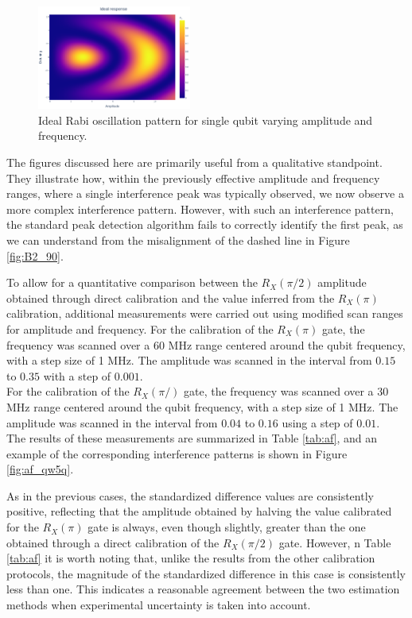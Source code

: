 \begin{figure}[h!]
    \centering
    \includegraphics[width=0.45\textwidth]{figures/png/IdealRX90.png}
    \caption{Ideal Rabi oscillation pattern for single qubit varying amplitude and frequency.}
    \label{fig:expected_RX90}
\end{figure}

The figures discussed here are primarily useful from a qualitative standpoint. 
They illustrate how, within the previously effective amplitude and frequency ranges, where a single interference peak was typically observed, we now observe a more complex interference pattern.
However, with such an interference pattern, the standard peak detection algorithm fails to correctly identify the first peak, as we can understand from the misalignment of the dashed line in Figure \ref{fig:B2_90}. 

To allow for a quantitative comparison between the $R_X(\pi/2)$ amplitude obtained through direct calibration and the value inferred from the $R_X(\pi)$ calibration, additional measurements were carried out using modified scan ranges for amplitude and frequency.
For the calibration of the $R_X(\pi)$ gate, the frequency was scanned over a 60 MHz range centered around the qubit frequency, with a step size of 1 MHz. 
The amplitude was scanned in the interval from $0.15$ to $0.35$ with a step of $0.001$.\\
For the calibration of the $R_X(\pi/)$ gate, the frequency was scanned over a 30 MHz range centered around the qubit frequency, with a step size of 1 MHz. 
The amplitude was scanned in the interval from $0.04$ to $0.16$ using a step of $0.01$.\\
The results of these measurements are summarized in Table \ref{tab:af}, and an example of the corresponding interference patterns is shown in Figure \ref{fig:af_qw5q}.

As in the previous cases, the standardized difference values are consistently positive, reflecting that the amplitude obtained by halving the value calibrated for the $R_X(\pi)$ gate is always, even though slightly, greater than the one obtained through a direct calibration of the $R_X(\pi/2)$ gate.
However, n Table \ref{tab:af} it is worth noting that, unlike the results from the other calibration protocols, the magnitude of the standardized difference in this case is consistently less than one. 
This indicates a reasonable agreement between the two estimation methods when experimental uncertainty is taken into account.

